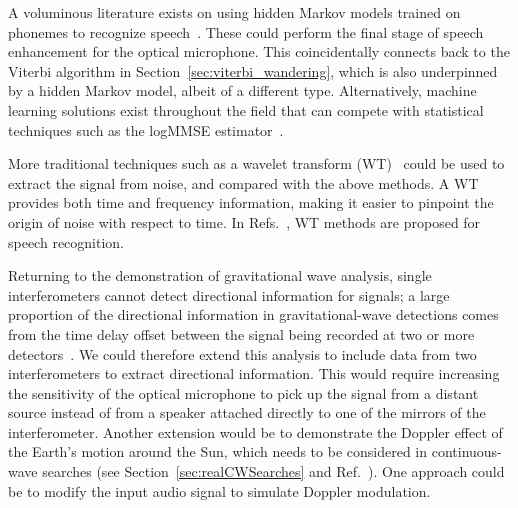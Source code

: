 \documentclass[paper-main.tex]{subfiles}
\begin{document}
A voluminous literature exists on using hidden Markov models trained on phonemes to recognize speech~\cite{HMM_english}. 
These could perform the final stage of speech enhancement for the optical microphone. 
This coincidentally connects back to the Viterbi algorithm in Section~\ref{sec:viterbi_wandering}, which is also underpinned by a hidden Markov model, albeit of a different type. Alternatively, machine learning solutions exist throughout the field that can compete with statistical techniques such as the logMMSE estimator~\cite{SEGAN}.


More traditional techniques such as a wavelet transform (WT)~\citep{nason1995stationary} could be used to extract the signal from noise, and compared with the above methods. 
A WT provides both time and frequency information, making it easier to pinpoint the origin of noise with respect to time. 
In Refs.~\cite{tufekci2000feature,agbinya1996discrete}, WT methods are proposed for speech recognition. 


Returning to the demonstration of gravitational wave analysis, single interferometers cannot detect directional information for signals; a large proportion of the directional information in gravitational-wave detections comes from the time delay offset between the signal being recorded at two or more detectors~\cite{GW150914}.
We could therefore extend this analysis to include data from two interferometers to extract directional information.
This would require increasing the sensitivity of the optical microphone to pick up the signal from a distant source instead of from a speaker attached directly to one of the mirrors of the interferometer.
Another extension would be to demonstrate the Doppler effect of the Earth's motion around the Sun, which needs to be considered in continuous-wave searches (see Section~\ref{sec:realCWSearches} and Ref.~\cite{JKS:1998}). 
One approach could be to modify the input audio signal to simulate Doppler modulation. 
\end{document}
